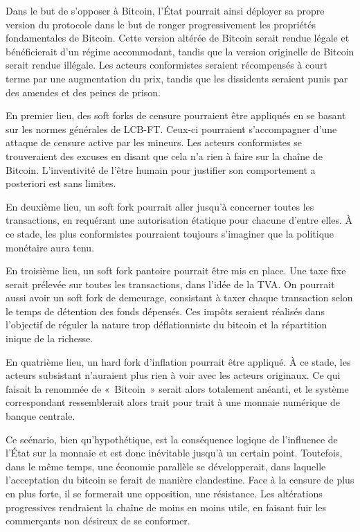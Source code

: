 Dans le but de s'opposer à Bitcoin, l'État pourrait ainsi déployer sa propre version du protocole dans le but de ronger progressivement les propriétés fondamentales de Bitcoin. Cette version altérée de Bitcoin serait rendue légale et bénéficierait d'un régime accommodant, tandis que la version originelle de Bitcoin serait rendue illégale. Les acteurs conformistes seraient récompensés à court terme par une augmentation du prix, tandis que les dissidents seraient punis par des amendes et des peines de prison.


En premier lieu, des soft forks de censure pourraient être appliqués en se basant sur les normes générales de LCB-FT. Ceux-ci pourraient s'accompagner d'une attaque de censure active par les mineurs. Les acteurs conformistes se trouveraient des excuses en disant que cela n'a rien à faire sur la chaîne de Bitcoin. L'inventivité de l'être humain pour justifier son comportement a posteriori est sans limites.

En deuxième lieu, un soft fork pourrait aller jusqu'à concerner toutes les transactions, en requérant une autorisation étatique pour chacune d'entre elles. À ce stade, les plus conformistes pourraient toujours s'imaginer que la politique monétaire aura tenu.

En troisième lieu, un soft fork pantoire pourrait être mis en place. Une taxe fixe serait prélevée sur toutes les transactions, dans l'idée de la TVA. On pourrait aussi avoir un soft fork de demeurage, consistant à taxer chaque transaction selon le temps de détention des fonds dépensés. Ces impôts seraient réalisés dans l'objectif de réguler la nature trop déflationniste du bitcoin et la répartition inique de la richesse.

En quatrième lieu, un hard fork d'inflation pourrait être appliqué. À ce stade, les acteurs subsistant n'auraient plus rien à voir avec les acteurs originaux. Ce qui faisait la renommée de «~Bitcoin~» serait alors totalement anéanti, et le système correspondant ressemblerait alors trait pour trait à une monnaie numérique de banque centrale.

Ce scénario, bien qu'hypothétique, est la conséquence logique de l'influence de l'État sur la monnaie et est donc inévitable jusqu'à un certain point. Toutefois, dans le même temps, une économie parallèle se développerait, dans laquelle l'acceptation du bitcoin se ferait de manière clandestine. Face à la censure de plus en plus forte, il se formerait une opposition, une résistance. Les altérations progressives rendraient la chaîne de moins en moins utile, en faisant fuir les commerçants non désireux de se conformer.

